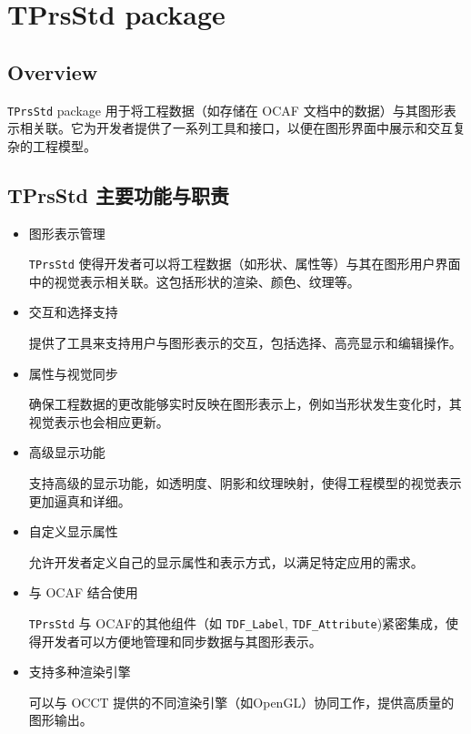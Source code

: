\documentclass[11pt]{article}
\begin{document}
\section{TPrsStd package}
\label{sec:org1a73278}

\subsection{Overview}
\label{sec:org3cbf0ad}

\texttt{TPrsStd} package 用于将工程数据（如存储在 OCAF 文档中的数据）与其图形表示相关联。它为开发者提供了一系列工具和接口，以便在图形界面中展示和交互复杂的工程模型。
\subsection{TPrsStd 主要功能与职责}
\label{sec:orgd159cc2}

\begin{itemize}
\item 图形表示管理

\texttt{TPrsStd} 使得开发者可以将工程数据（如形状、属性等）与其在图形用户界面中的视觉表示相关联。这包括形状的渲染、颜色、纹理等。

\item 交互和选择支持

提供了工具来支持用户与图形表示的交互，包括选择、高亮显示和编辑操作。

\item 属性与视觉同步

确保工程数据的更改能够实时反映在图形表示上，例如当形状发生变化时，其视觉表示也会相应更新。

\item 高级显示功能

支持高级的显示功能，如透明度、阴影和纹理映射，使得工程模型的视觉表示更加逼真和详细。

\item 自定义显示属性

允许开发者定义自己的显示属性和表示方式，以满足特定应用的需求。

\item 与 OCAF 结合使用

\texttt{TPrsStd} 与 OCAF的其他组件（如 \texttt{TDF\_Label}, \texttt{TDF\_Attribute})紧密集成，使得开发者可以方便地管理和同步数据与其图形表示。

\item 支持多种渲染引擎

可以与 OCCT 提供的不同渲染引擎（如OpenGL）协同工作，提供高质量的图形输出。
\end{itemize}
\end{document}
